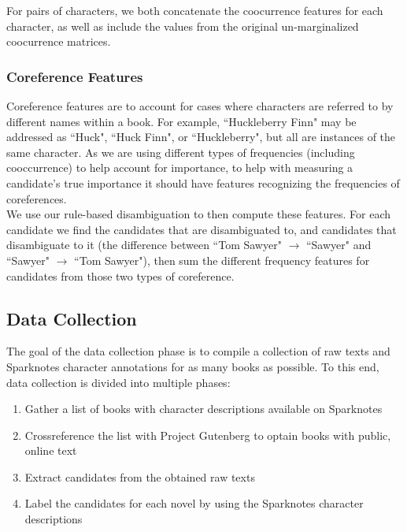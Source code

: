 \documentclass[12pt]{article}
\begin{document}
        For pairs of characters, we both concatenate the coocurrence features for each character, as well
        as include the values from the original un-marginalized coocurrence matrices.

        \subsubsection{Coreference Features}
        
        Coreference features are to account for cases where characters are referred to by different 
        names within a book. For example, ``Huckleberry Finn" may be addressed as ``Huck", ``Huck Finn",
        or ``Huckleberry", but all are instances of the same character. As we are using different
        types of frequencies (including cooccurrence) to help account for importance, to help
        with measuring a candidate's true importance it should have features recognizing the 
        frequencies of coreferences. \\

        We use our rule-based disambiguation to then compute these features. For each candidate we
        find the candidates that are disambiguated to, and candidates that disambiguate to it
        (the difference between ``Tom Sawyer" $\to$ ``Sawyer" and ``Sawyer" $\to$ ``Tom Sawyer"), then sum
        the different frequency features for candidates from those two types of coreference.

    \subsection{Data Collection}

        The goal of the data collection phase is to compile a collection of raw texts and Sparknotes
        character annotations for as many books as possible.  To this end, data collection is divided into
        multiple phases: 
        \begin{enumerate}
                \setlength\itemsep{0em}
                \item Gather a list of books with character descriptions available on Sparknotes
                \item Crossreference the list with Project Gutenberg \cite{gutenberg} to optain books with public, online text
                \item Extract candidates from the obtained raw texts
                \item Label the candidates for each novel by using the Sparknotes character descriptions
        \end{enumerate}
\end{document}
